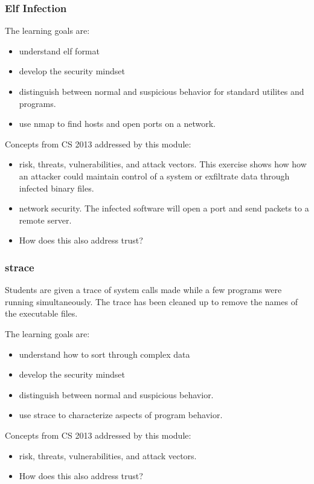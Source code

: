 \subsubsection{Elf Infection}
The learning goals are:
\begin{itemize}
\item understand elf format
\item develop the security mindset
\item distinguish between normal and suspicious behavior for standard utilites and programs.
\item use nmap to find hosts and open ports on a network.
\end{itemize}
Concepts from CS 2013 addressed by this module:
\begin{itemize}
\item  risk, threats, vulnerabilities, and attack vectors.  This exercise shows how how an attacker
  could maintain control of a system or exfiltrate data through infected binary files.
\item network security.  The infected software will open a port and send packets to a remote server.
\item How does this also address trust?
\end{itemize}

\subsubsection{strace}
Students are given a trace of system calls made while a few programs were running simultaneously.
The trace has been cleaned up to remove the names of the executable files.

The learning goals are:
\begin{itemize}
\item understand how to sort through complex data
\item develop the security mindset
\item distinguish between normal and suspicious behavior.
\item use strace to characterize aspects of program behavior.
\end{itemize}
Concepts from CS 2013 addressed by this module:
\begin{itemize}
\item  risk, threats, vulnerabilities, and attack vectors.  

\item How does this also address trust?
\end{itemize}


